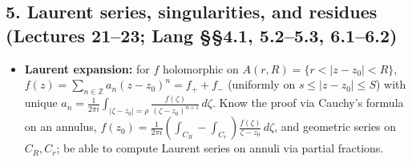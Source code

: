 \documentclass[12pt, reqno]{amsart}
\theoremstyle{definition}
\numberwithin{equation}{subsection}
\DeclareMathOperator{\Res}{Res}
\newcommand{\zee}{\mathbb{Z}}
\renewcommand{\Im}{\mathrm{Im}}
\begin{document}
\subsection*{5. Laurent series, singularities, and residues \normalfont (Lectures 21--23; Lang \S\S4.1, 5.2--5.3, 6.1--6.2)}
\begin{itemize}[leftmargin=*]
\item \textbf{Laurent expansion:} for $f$ holomorphic on $A(r,R)=\{r<|z-z_0|<R\}$, $f(z)=\sum_{n\in\zee}a_n(z-z_0)^n=f_++f_-$
      (uniformly on $s\le|z-z_0|\le S$) with unique $a_n=\frac{1}{2\pi i}\int_{|\zeta-z_0|=\rho}\frac{f(\zeta)}{(\zeta-z_0)^{n+1}}\,d\zeta$.
      Know the proof via Cauchy's formula on an annulus, $f(z_0)=\frac{1}{2\pi i}(\int_{C_R}-\int_{C_r})\frac{f(\zeta)}{\zeta-z_0}\,d\zeta$,
      and geometric series on $C_R,C_r$; be able to compute Laurent series on annuli via partial fractions.
\end{itemize}
\end{document}
